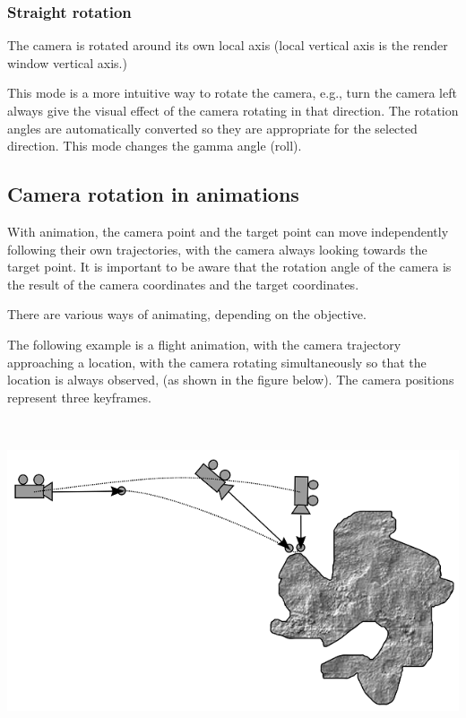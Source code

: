 \subsubsection{Straight rotation}\label{straight-rotation}

The camera is rotated around its own local axis (local vertical axis is
the render window vertical axis.)

This mode is a more intuitive way to rotate the camera, e.g., turn the
camera left always give the visual effect of the camera rotating in that
direction. The rotation angles are automatically converted so they are
appropriate for the selected direction. This mode changes the gamma
angle (roll).

\subsection{Camera rotation in
animations}\label{camera-rotation-in-animations}

With animation, the camera point and the target point can move
independently following their own trajectories, with the camera always
looking towards the target point. It is important to be aware that the
rotation angle of the camera is the result of the camera coordinates and
the target coordinates.

There are various ways of animating, depending on the objective.

The following example is a flight animation, with the camera trajectory
approaching a location, with the camera rotating simultaneously so that
the location is always observed, (as shown in the figure below). The
camera positions represent three keyframes.

\includegraphics[width=6.52292in,height=3.75556in]{img/manual/media/image18.png}

